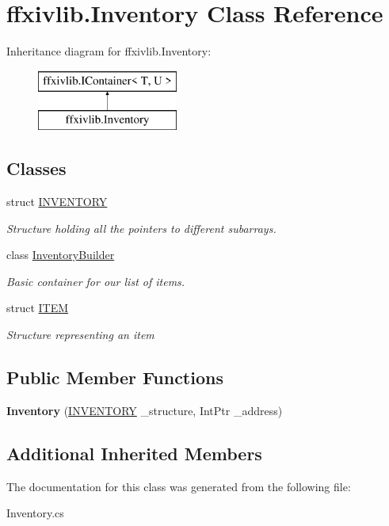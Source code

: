 \hypertarget{classffxivlib_1_1_inventory}{\section{ffxivlib.\-Inventory Class Reference}
\label{classffxivlib_1_1_inventory}
}
Inheritance diagram for ffxivlib.\-Inventory\-:\begin{figure}[H]
\begin{center}
\leavevmode
\includegraphics[height=2.000000cm]{classffxivlib_1_1_inventory}
\end{center}
\end{figure}
\subsection*{Classes}
\begin{DoxyCompactItemize}
\item 
struct \hyperlink{structffxivlib_1_1_inventory_1_1_i_n_v_e_n_t_o_r_y}{I\-N\-V\-E\-N\-T\-O\-R\-Y}
\begin{DoxyCompactList}\small\item\em Structure holding all the pointers to different subarrays. \end{DoxyCompactList}\item 
class \hyperlink{classffxivlib_1_1_inventory_1_1_inventory_builder}{Inventory\-Builder}
\begin{DoxyCompactList}\small\item\em Basic container for our list of items. \end{DoxyCompactList}\item 
struct \hyperlink{structffxivlib_1_1_inventory_1_1_i_t_e_m}{I\-T\-E\-M}
\begin{DoxyCompactList}\small\item\em Structure representing an item \end{DoxyCompactList}\end{DoxyCompactItemize}
\subsection*{Public Member Functions}
\begin{DoxyCompactItemize}
\item 
\hypertarget{classffxivlib_1_1_inventory_a9d73c04553df4339d5fd742a32de937e}{{\bfseries Inventory} (\hyperlink{structffxivlib_1_1_inventory_1_1_i_n_v_e_n_t_o_r_y}{I\-N\-V\-E\-N\-T\-O\-R\-Y} \-\_\-structure, Int\-Ptr \-\_\-address)}\label{classffxivlib_1_1_inventory_a9d73c04553df4339d5fd742a32de937e}

\end{DoxyCompactItemize}
\subsection*{Additional Inherited Members}


The documentation for this class was generated from the following file\-:\begin{DoxyCompactItemize}
\item 
Inventory.\-cs\end{DoxyCompactItemize}
